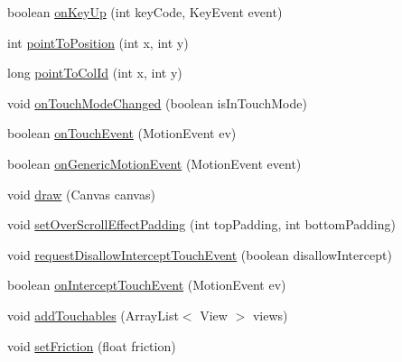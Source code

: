 \begin{DoxyCompactItemize}
boolean \hyperlink{classit_1_1sephiroth_1_1android_1_1library_1_1widget_1_1_abs_h_list_view_a8ddd25ce6e4253e5d6123f9f295b00a8}{on\+Key\+Up} (int key\+Code, Key\+Event event)
\item 
int \hyperlink{classit_1_1sephiroth_1_1android_1_1library_1_1widget_1_1_abs_h_list_view_a8430a7a76176d02b946bd2d996c3e426}{point\+To\+Position} (int x, int y)
\item 
long \hyperlink{classit_1_1sephiroth_1_1android_1_1library_1_1widget_1_1_abs_h_list_view_a60887c426af646fa7ca7c5105927b02d}{point\+To\+Col\+Id} (int x, int y)
\item 
void \hyperlink{classit_1_1sephiroth_1_1android_1_1library_1_1widget_1_1_abs_h_list_view_a638b9d58a2bc0223d9e3b2a0fbe53f4a}{on\+Touch\+Mode\+Changed} (boolean is\+In\+Touch\+Mode)
\item 
boolean \hyperlink{classit_1_1sephiroth_1_1android_1_1library_1_1widget_1_1_abs_h_list_view_a126dc025200915a60e7eb729aa59248c}{on\+Touch\+Event} (Motion\+Event ev)
\item 
boolean \hyperlink{classit_1_1sephiroth_1_1android_1_1library_1_1widget_1_1_abs_h_list_view_a21d89f682c53573d5943c79ed76be556}{on\+Generic\+Motion\+Event} (Motion\+Event event)
\item 
void \hyperlink{classit_1_1sephiroth_1_1android_1_1library_1_1widget_1_1_abs_h_list_view_afd56aecc523092b8fce574578ed9ac97}{draw} (Canvas canvas)
\item 
void \hyperlink{classit_1_1sephiroth_1_1android_1_1library_1_1widget_1_1_abs_h_list_view_af47c4aba7a7475b6372e9f2cfc8fcd47}{set\+Over\+Scroll\+Effect\+Padding} (int top\+Padding, int bottom\+Padding)
\item 
void \hyperlink{classit_1_1sephiroth_1_1android_1_1library_1_1widget_1_1_abs_h_list_view_a844a379b5acd7f3d65ad1af0ebb44d7e}{request\+Disallow\+Intercept\+Touch\+Event} (boolean disallow\+Intercept)
\item 
boolean \hyperlink{classit_1_1sephiroth_1_1android_1_1library_1_1widget_1_1_abs_h_list_view_ade9d5d65fed1e50c5aaf2c4d066df25b}{on\+Intercept\+Touch\+Event} (Motion\+Event ev)
\item 
void \hyperlink{classit_1_1sephiroth_1_1android_1_1library_1_1widget_1_1_abs_h_list_view_a1a05f445afa8b018d6999ed51a1e4062}{add\+Touchables} (Array\+List$<$ View $>$ views)
\item 
void \hyperlink{classit_1_1sephiroth_1_1android_1_1library_1_1widget_1_1_abs_h_list_view_a89e8694772f58752b492ccaf8340517c}{set\+Friction} (float friction)
\item 

\end{DoxyCompactItemize}
